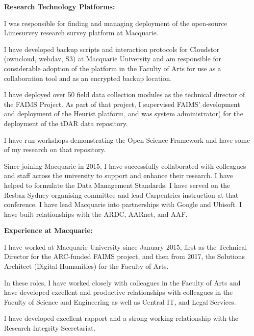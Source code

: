 \documentclass[11pt, a4paper]{awesome-cv}
\begin{document}
\begin{cvletter}

\textbf{Research Technology Platforms:} 
\begin{letteritems}
\item {I was responsible for finding and managing deployment of the open-source Limesurvey research survey platform at Macquarie.}
\item {I have developed backup scripts and interaction protocols for Cloudstor (owncloud, webdav, S3) at Macquarie University and am responsible for considerable adoption of the platform in the Faculty of Arts for use as a collaboration tool and as an encrypted backup location.}
\item {I have deployed over 50 field data collection modules as the technical director of the FAIMS Project. As part of that project, I supervised FAIMS' development and deployment of the Heurist platform, and was system administrator) for the deployment of the tDAR data repository.}
\item {I have run workshops demonstrating the Open Science Framework and have some of my research on that repository.}
\end{letteritems}



Since joining Macquarie in 2015, I have successfully collaborated with colleagues and staff across the university to support and enhance their research. I have helped to formulate the Data Management Standards. I have served on the Resbaz Sydney organising committee and lead Carpentries instruction at that conference. I have lead Macquarie into partnerships with Google and Ubisoft. I have built relationships with the ARDC, AARnet, and AAF. 

\textbf{Experience at Macquarie:} 

\begin{letteritems}
\item {I have worked at Macquarie University since January 2015, first as the Technical Director for the ARC-funded FAIMS project, and then from 2017, the Solutions Architect (Digital Humanities) for the Faculty of Arts.}
\item {In these roles, I have worked closely with colleagues in the Faculty of Arts and have developed excellent and productive relationships with colleagues in the Faculty of Science and Engineering as well as Central IT, and Legal Services.}
\item {I have developed excellent rapport and a strong working relationship with the Research Integrity Secretariat.}
\end{letteritems}


\end{cvletter}
\end{document}
